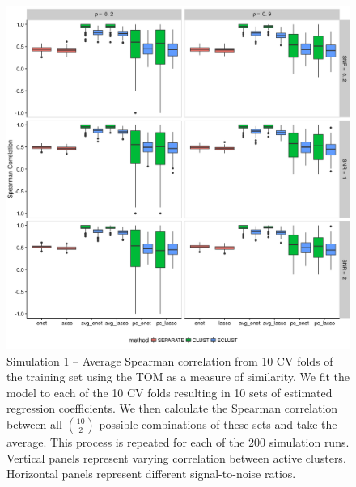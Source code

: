 \begin{figure}[H]
	\centering
	\includegraphics[scale=0.6, keepaspectratio]{./figs/hydra/results/figures/sim1-sept10/spearman_TOM_sim1.png}
	\caption{Simulation 1 -- Average Spearman correlation from 10 CV folds of the training set using the TOM as a measure of similarity. We fit the model to each of the 10 CV folds resulting in 10 sets of estimated regression coefficients. We then calculate the Spearman correlation between all $\binom{10}{2}$ possible combinations of these sets and take the average. This process is repeated for each of the 200 simulation runs. Vertical panels represent varying correlation between active clusters. Horizontal panels represent different signal-to-noise ratios.}
	\label{fig:spearman_TOM_sim1}
\end{figure}


